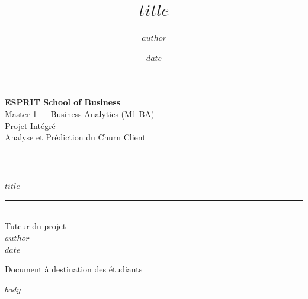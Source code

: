 \documentclass[11pt,a4paper]{article}
\title{\color{primary}\textbf{$title$}}
\author{$author$}
\date{$date$}
\begin{document}
\begin{titlepage}
\centering
\vspace*{1.5cm}

{\Large\bfseries ESPRIT School of Business}\\[0.3cm]
{\large Master 1 --- Business Analytics (M1 BA)}\\[2cm]

{\color{gray}\large Projet Intégré}\\[0.3cm]
{\color{gray}\large Analyse et Prédiction du Churn Client}\\[2.2cm]

\rule{0.85\linewidth}{1.2pt}\\[0.6cm]
{\Huge\bfseries\color{primary} $title$\par}
\rule{0.85\linewidth}{1.2pt}\\[2cm]

{\large Tuteur du projet}\\[0.2cm]
{\Large\bfseries $author$}\\[1cm]
{\large $date$}

\vfill
{\color{gray}\small Document à destination des étudiants}
\end{titlepage}

\tableofcontents
\newpage

$body$
\end{document}

